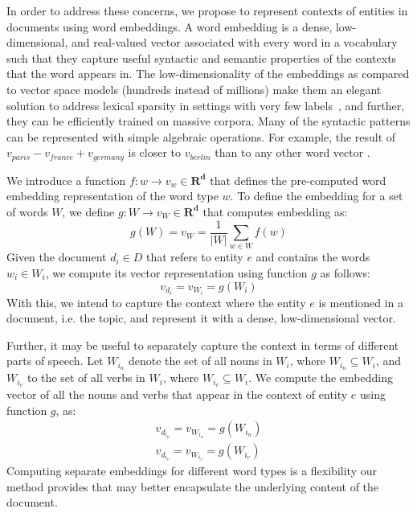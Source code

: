 \documentclass{article}
\begin{document}
In order to address these concerns, we propose to represent contexts of entities in documents using word embeddings.
A word embedding is a dense, low-dimensional, and real-valued vector associated with every word in a vocabulary such that they capture useful syntactic and semantic properties of the contexts that the word appears in.
The low-dimensionality of the embeddings as compared to vector space models (hundreds instead of millions) make them an elegant solution to address lexical sparsity in settings with very few labels~\cite{Turian10wordrepresentations}, and further, they can be efficiently trained on massive corpora.
Many of the syntactic patterns can be represented with simple algebraic operations. For example, the result of $v_{paris} - v_{france} + v_{germany}$ is closer to $v_{berlin}$ than to any other word vector \cite{mikolovChen,mikolovYih}.


We introduce a function $f : w \rightarrow v_w \in \mathbf{R^d}$ that defines the pre-computed word embedding representation of the word type $w$. 
To define the embedding for a set of words $W$, we define $g : W \rightarrow v_W \in \mathbf{R^d}$ that computes embedding as: %
\begin{equation}
\label{wordembedding}
g(W) = v_W = \frac{1}{|W|} \sum_{w \in W}{f(w)}
\end{equation}
Given the document $d_i \in D$ that refers to entity $e$ and contains the words $w_i \in W_i$, we compute its vector representation using function $g$ as follows:
\begin{equation}
\label{wordembedding1}
v_{d_i} = v_{W_i} = g(W_i)
\end{equation}
With this, we intend to capture the context where the entity $e$ is mentioned in a document, i.e. the topic, and represent it with a dense, low-dimensional vector.

Further, it may be useful to separately capture the context in terms of different parts of speech.
Let $W_{i_n}$ denote the set of all nouns in $W_i$, where $W_{i_n} \subseteq W_i$, and $W_{i_v}$ to the set of all verbs in $W_i$, where $W_{i_v} \subseteq W_i$. We compute the embedding vector of all the nouns and verbs that appear in the context of entity $e$ using function $g$, as: %
\begin{eqnarray}
v_{d_{i_n}} = v_{W_{i_n}} = g(W_{i_n})\label{nouns}
\\
v_{d_{i_v}} = v_{W_{i_v}} = g(W_{i_v})\label{verbs}
\end{eqnarray}
Computing separate embeddings for different word types is a flexibility our method provides that may better encapsulate the underlying content of the document.
\end{document}
